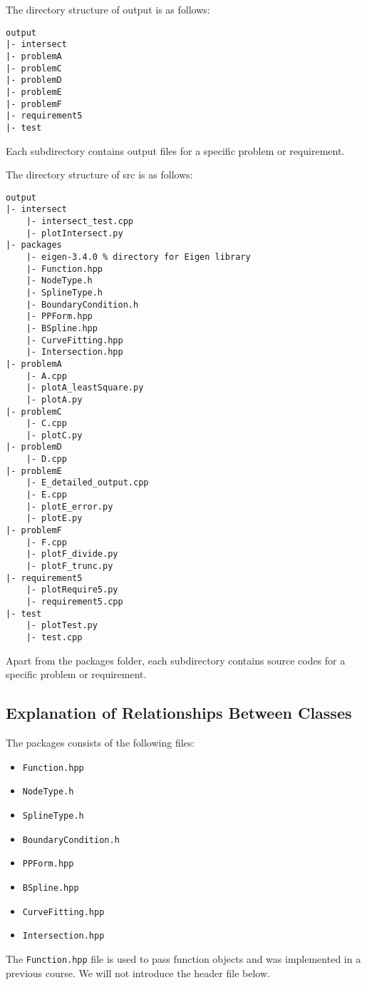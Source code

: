 \documentclass[a4paper]{article}
\begin{document}
\begin{sloppypar}
The directory structure of output is as follows:
\begin{lstlisting}
output
|- intersect
|- problemA
|- problemC
|- problemD
|- problemE
|- problemF
|- requirement5
|- test
\end{lstlisting}
Each subdirectory contains output files for a specific problem or requirement.

The directory structure of src is as follows:
\begin{lstlisting}
output
|- intersect
    |- intersect_test.cpp
    |- plotIntersect.py
|- packages 
    |- eigen-3.4.0 % directory for Eigen library
    |- Function.hpp
    |- NodeType.h
    |- SplineType.h
    |- BoundaryCondition.h
    |- PPForm.hpp
    |- BSpline.hpp
    |- CurveFitting.hpp
    |- Intersection.hpp
|- problemA
    |- A.cpp
    |- plotA_leastSquare.py
    |- plotA.py
|- problemC
    |- C.cpp
    |- plotC.py
|- problemD
    |- D.cpp
|- problemE
    |- E_detailed_output.cpp
    |- E.cpp
    |- plotE_error.py
    |- plotE.py
|- problemF
    |- F.cpp
    |- plotF_divide.py
    |- plotF_trunc.py
|- requirement5
    |- plotRequire5.py
    |- requirement5.cpp
|- test
    |- plotTest.py
    |- test.cpp
\end{lstlisting}

Apart from the packages folder, each subdirectory contains source codes for a
specific problem or requirement.

\subsection{Explanation of Relationships Between Classes}
The packages consists of the following files:
\begin{itemize}
  \item \texttt{Function.hpp}
  \item \texttt{NodeType.h}
  \item \texttt{SplineType.h}
  \item \texttt{BoundaryCondition.h}
  \item \texttt{PPForm.hpp}
  \item \texttt{BSpline.hpp}
  \item \texttt{CurveFitting.hpp}
  \item \texttt{Intersection.hpp}
\end{itemize}

The \verb|Function.hpp| file is used to pass function objects and was
implemented in a previous course. We will not introduce the header file below.


\end{sloppypar}
\end{document}
